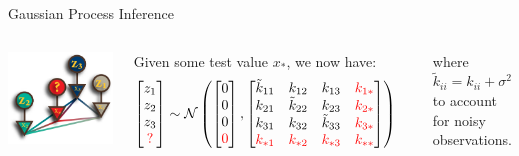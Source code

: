 \documentclass[aspectratio=169,19pt,xetex,handout]{beamer}
\begin{document}
\begin{frame}{Gaussian Process Inference}
\Large

\begin{columns}[T] %
\includegraphics[width=\textwidth]{gp_inference_question}

Given some test value $x_*$, we now have:
\begin{align*}
\begin{bmatrix} z_1 \\ z_2 \\ z_3 \\ \textcolor{red}{?} \end{bmatrix} 
& \sim \mathcal{N}\left(\begin{bmatrix} 0 \\ 0 \\ 0 \\ \textcolor{red}{0} \end{bmatrix}, \begin{bmatrix} \tilde k_{11} & k_{12} & k_{13} & \textcolor{red}{k_{1*}} \\ k_{21} & \tilde k_{22} & k_{23} & \textcolor{red}{k_{2*}} \\ k_{31} & k_{32} & \tilde k_{33} &  \textcolor{red}{k_{3*}} \\ \textcolor{red}{k_{*1}} & \textcolor{red}{k_{*2}} & \textcolor{red}{k_{*3}} &  \textcolor{red}{k_{**}} \end{bmatrix} \right)
\end{align*}

where $\tilde k_{ii} = k_{ii} + \sigma^2$ to account for noisy observations.

\end{columns}

\end{frame}
\end{document}
